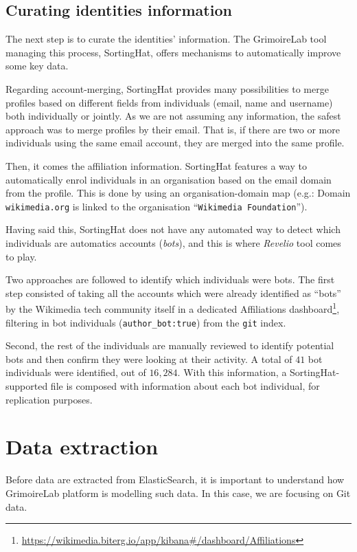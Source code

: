 \documentclass[a4paper, 12pt]{book}
\begin{document}
\subsection{Curating identities information}
\label{ssec:curate-identities}

The next step is to curate the identities' information. The GrimoireLab tool managing this process, SortingHat, offers mechanisms to automatically improve some key data.

Regarding account-merging, SortingHat provides many possibilities to merge profiles based on different fields from individuals (email, name and username) both individually or jointly. As we are not assuming any information, the safest approach was to merge profiles by their email. That is, if there are two or more individuals using the same email account, they are merged into the same profile.

Then, it comes the affiliation information. SortingHat features a way to automatically enrol individuals in an organisation based on the email domain from the profile. This is done by using an organisation-domain map (e.g.: Domain \texttt{wikimedia.org} is linked to the organisation ``\texttt{Wikimedia Foundation}'').

Having said this, SortingHat does not have any automated way to detect which individuals are automatics accounts (\emph{bots}), and this is where \emph{Revelio} tool comes to play.

Two approaches are followed to identify which individuals were bots. The first step consisted of taking all the accounts which were already identified as ``bots'' by the Wikimedia tech community itself in a dedicated Affiliations dashboard\footnote{\url{https://wikimedia.biterg.io/app/kibana\#/dashboard/Affiliations}}, filtering in bot individuals (\texttt{author\_bot:true}) from the \texttt{git} index.

Second, the rest of the individuals are manually reviewed to identify potential bots and then confirm they were looking at their activity. A total of $41$ bot individuals were identified, out of $16,284$. With this information, a SortingHat-supported file is composed with information about each bot individual, for replication purposes.

\section{Data extraction} 
\label{sec:data-extraction}

Before data are extracted from ElasticSearch, it is important to understand how GrimoireLab platform is modelling such data. In this case, we are focusing on Git data.
\end{document}
